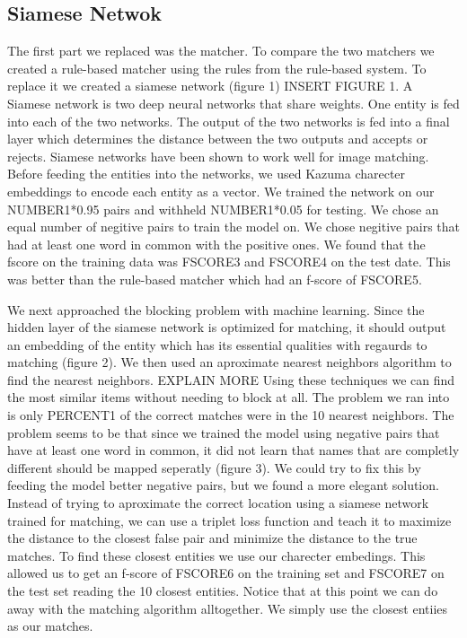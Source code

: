 \documentclass{vldb}
\begin{document}
\subsection{Siamese Netwok}
The first part we replaced was the matcher. To compare the two matchers we created a rule-based matcher using the rules from the rule-based system. To replace it we created a siamese network (figure 1) INSERT FIGURE 1. A Siamese network is two deep neural networks that share weights. One entity is fed into each of the two networks. The output of the two networks is fed into a final layer which determines the distance between the two outputs and accepts or rejects. Siamese networks have been shown to work well for image matching.\cite{Hasdell:Siamese} Before feeding the entities into the networks, we used Kazuma charecter embeddings to encode each entity as a vector. We trained the network on our NUMBER1*0.95 pairs and withheld NUMBER1*0.05 for testing. We chose an equal number of negitive pairs to train the model on. We chose negitive pairs that had at least one word in common with the positive ones. We found that the fscore on the training data was FSCORE3 and FSCORE4 on the test date. This was better than the rule-based matcher which had an f-score of FSCORE5.

We next approached the blocking problem with machine learning. Since the hidden layer of the siamese network is optimized for matching, it should output an embedding of the entity which has its essential qualities with regaurds to matching (figure 2). We then used an aproximate nearest neighbors algorithm to find the nearest neighbors. EXPLAIN MORE Using these techniques we can find the most similar items without needing to block at all. The problem we ran into is only PERCENT1 of the correct matches were in the 10 nearest neighbors. The problem seems to be that since we trained the model using negative pairs that have at least one word in common, it did not learn that names that are completly different should be mapped seperatly (figure 3). We could try to fix this by feeding the model better negative pairs, but we found a more elegant solution. Instead of trying to aproximate the correct location using a siamese network trained for matching, we can use a triplet loss function and teach it to maximize the distance to the closest false pair and minimize the distance to the true matches. To find these closest entities we use our charecter embedings. This allowed us to get an f-score of FSCORE6 on the training set and FSCORE7 on the test set reading the 10 closest entities. Notice that at this point we can do away with the matching algorithm alltogether. We simply use the closest entiies as our matches.
\end{document}
